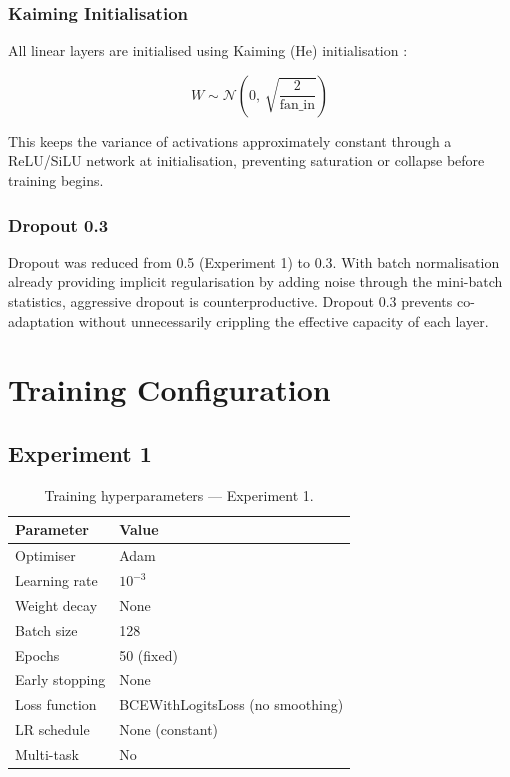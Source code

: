 \documentclass[12pt, a4paper]{article}
\begin{document}
\subsubsection{Kaiming Initialisation}

All linear layers are initialised using Kaiming (He) initialisation \cite{he2015delving}:

\begin{equation}
W \sim \mathcal{N}\!\left(0,\, \sqrt{\frac{2}{\text{fan\_in}}}\right)
\end{equation}

This keeps the variance of activations approximately constant through a ReLU/SiLU network at initialisation, preventing saturation or collapse before training begins.

\subsubsection{Dropout 0.3}

Dropout was reduced from 0.5 (Experiment 1) to 0.3. With batch normalisation already providing implicit regularisation by adding noise through the mini-batch statistics, aggressive dropout is counterproductive. Dropout 0.3 prevents co-adaptation without unnecessarily crippling the effective capacity of each layer.

\section{Training Configuration}

\subsection{Experiment 1}

\begin{table}[h!]
\centering
\caption{Training hyperparameters — Experiment 1.}
\begin{tabular}{ll}
\toprule
\textbf{Parameter} & \textbf{Value} \\
\midrule
Optimiser           & Adam \\
Learning rate       & $10^{-3}$ \\
Weight decay        & None \\
Batch size          & 128 \\
Epochs              & 50 (fixed) \\
Early stopping      & None \\
Loss function       & BCEWithLogitsLoss (no smoothing) \\
LR schedule         & None (constant) \\
Multi-task          & No \\
\bottomrule
\end{tabular}
\end{table}
\end{document}
